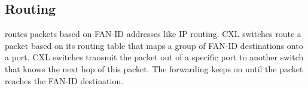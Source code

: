 


\subsection{Routing}
\label{aurelia:sec:design:routing}
\aurelia routes packets based on FAN-ID addresses like IP routing.
%
CXL switches route a packet based on its routing table that maps a group of FAN-ID destinations onto a port. 
%
CXL switches transmit the packet out of a specific port to another switch that knows the next hop of this packet. 
%
The forwarding keeps on until the packet reaches the FAN-ID destination.

